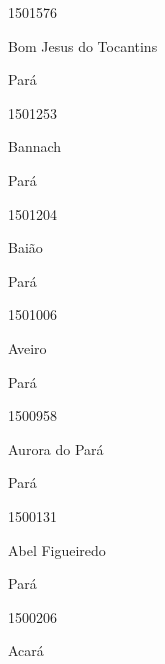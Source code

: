 \documentclass[
  letterpaper,
]{report}
\begin{document}
\n      

1501576

\n      

Bom Jesus do Tocantins

\n    

\n    

\n      

Pará

\n      

1501253

\n      

Bannach

\n    

\n    

\n      

Pará

\n      

1501204

\n      

Baião

\n    

\n    

\n      

Pará

\n      

1501006

\n      

Aveiro

\n    

\n    

\n      

Pará

\n      

1500958

\n      

Aurora do Pará

\n    

\n    

\n      

Pará

\n      

1500131

\n      

Abel Figueiredo

\n    

\n    

\n      

Pará

\n      

1500206

\n      

Acará

\n    
\end{document}
